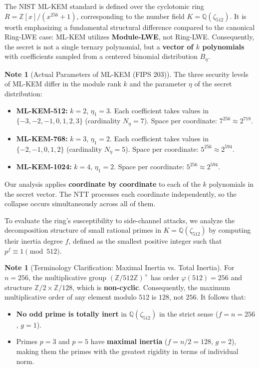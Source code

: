 \documentclass[11pt,a4paper]{article}
\theoremstyle{plain}
\theoremstyle{definition}
\newtheorem{remark}[teorema]{Note}
\numberwithin{equation}{section}
\newcommand{\QQ}{\mathbb{Q}}
\newcommand{\ZZ}{\mathbb{Z}}
\begin{document}
The NIST ML-KEM standard is defined over the cyclotomic ring $R = \ZZ[x]/(x^{256}+1)$, corresponding to the number field $K = \QQ(\zeta_{512})$. It is worth emphasizing a fundamental structural difference compared to the canonical Ring-LWE case: ML-KEM utilizes \textbf{Module-LWE}, not Ring-LWE. Consequently, the secret is not a single ternary polynomial, but a \textbf{vector of $k$ polynomials} with coefficients sampled from a centered binomial distribution $B_\eta$.

\begin{remark}[Actual Parameters of ML-KEM (FIPS 203)]
\label{rem:parametros_mlkem}
The three security levels of ML-KEM differ in the module rank $k$ and the parameter $\eta$ of the secret distribution:
\begin{itemize}
    \item \textbf{ML-KEM-512:} $k = 2$, $\eta_1 = 3$. Each coefficient takes values in $\{-3, -2, -1, 0, 1, 2, 3\}$ (cardinality $N_\eta = 7$). Space per coordinate: $7^{256} \approx 2^{718}$.
    \item \textbf{ML-KEM-768:} $k = 3$, $\eta_1 = 2$. Each coefficient takes values in $\{-2, -1, 0, 1, 2\}$ (cardinality $N_\eta = 5$). Space per coordinate: $5^{256} \approx 2^{594}$.
    \item \textbf{ML-KEM-1024:} $k = 4$, $\eta_1 = 2$. Space per coordinate: $5^{256} \approx 2^{594}$.
\end{itemize}
Our analysis applies \textbf{coordinate by coordinate} to each of the $k$ polynomials in the secret vector. The NTT processes each coordinate independently, so the collapse occurs simultaneously across all of them.
\end{remark}

To evaluate the ring's susceptibility to side-channel attacks, we analyze the decomposition structure of small rational primes in $K = \QQ(\zeta_{512})$ by computing their inertia degree $f$, defined as the smallest positive integer such that $p^f \equiv 1 \pmod{512}$.

\begin{remark}[Terminology Clarification: Maximal Inertia vs. Total Inertia]
\label{rem:inercia_maximal}
For $n = 256$, the multiplicative group $(\ZZ/512\ZZ)^\times$ has order $\varphi(512) = 256$ and structure $\ZZ/2 \times \ZZ/128$, which is \textbf{non-cyclic}. Consequently, the maximum multiplicative order of any element modulo $512$ is $128$, not $256$. It follows that:
\begin{itemize}
    \item \textbf{No odd prime is totally inert} in $\QQ(\zeta_{512})$ in the strict sense ($f = n = 256$, $g = 1$).
    \item Primes $p=3$ and $p=5$ have \textbf{maximal inertia} ($f = n/2 = 128$, $g = 2$), making them the primes with the greatest rigidity in terms of individual norm.
\end{itemize}
\end{remark}
\end{document}
